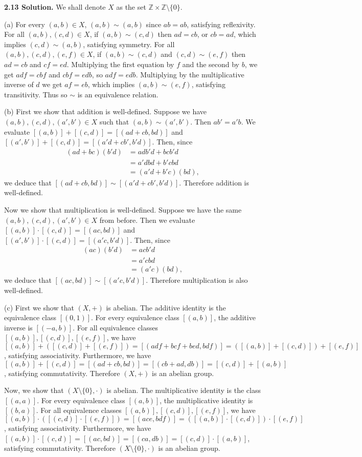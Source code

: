 \textbf{2.13 Solution.} We shall denote $X$ as the set $\mathbb{Z}\times\mathbb{Z}\setminus\{0\}$.

(a) For every $(a,b)\in X$, $(a,b)\sim(a,b)$ since $ab=ab$, satisfying reflexivity. For all $(a,b),(c,d)\in X$, if $(a,b)\sim(c,d)$ then $ad=cb$, or $cb=ad$, which implies $(c,d)\sim(a,b)$, satisfying symmetry. For all $(a,b),(c,d),(e,f)\in X$, if $(a,b)\sim(c,d)$ and $(c,d)\sim(e,f)$ then $ad=cb$ and $cf=ed$. Multiplying the first equation by $f$ and the second by $b$, we get $adf=cbf$ and $cbf=edb$, so $adf=edb$. Multiplying by the multiplicative inverse of $d$ we get $af=eb$, which implies $(a,b)\sim(e,f)$, satisfying transitivity. Thus so $\sim$ is an equivalence relation.

(b) First we show that addition is well-defined. Suppose we have $(a,b),(c,d),(a',b')\in X$ such that $(a,b)\sim(a',b')$. Then $ab'=a'b$. We evaluate $[(a,b)]+[(c,d)]=[(ad+cb,bd)]$ and $[(a',b')]+[(c,d)]=[(a'd+cb',b'd)]$. Then, since
\begin{align*}
    (ad+bc)(b'd) &= adb'd+bcb'd \\
                 &= a'dbd+b'cbd \\
                 &= (a'd+b'c)(bd),
\end{align*}
we deduce that $[(ad+cb,bd)]\sim[(a'd+cb',b'd)]$. Therefore addition is well-defined.

Now we show that multiplication is well-defined. Suppose we have the same $(a,b),(c,d),(a',b') \in X$ from before. Then we evaluate $[(a,b)]\cdot[(c,d)] = [(ac,bd)]$ and $[(a',b')]\cdot[(c,d)] = [(a'c,b'd)]$. Then, since 
\begin{align*}
    (ac)(b'd) &= acb'd \\
              &= a'cbd \\
              &= (a'c)(bd),
\end{align*}
we deduce that $[(ac,bd)]\sim[(a'c,b'd)]$. Therefore multiplication is also well-defined.

(c) First we show that $(X,+)$ is abelian. The additive identity is the equivalence class $[(0,1)]$. For every equivalence class $[(a,b)]$, the additive inverse is $[(-a,b)]$. For all equivalence classes $[(a,b)],[(c,d)],[(e,f)]$, we have $[(a,b)]+([(c,d)]+[(e,f)])=[(adf+bcf+bed,bdf)]=([(a,b)]+[(c,d)])+[(e,f)]$, satisfying associativity. Furthermore, we have $[(a,b)]+[(c,d)]=[(ad+cb,bd)]=[(cb+ad,db)]=[(c,d)]+[(a,b)]$, satisfying commutativity. Therefore $(X,+)$ is an abelian group.

Now, we show that $(X\setminus\{0\},\cdot)$ is abelian. The multiplicative identity is the class $[(a,a)]$. For every equivalence class $[(a,b)]$, the multiplicative identity is $[(b,a)]$. For all equivalence classes $[(a,b)],[(c,d)],[(e,f)]$, we have $[(a,b)]\cdot([(c,d)]\cdot[(e,f)]) = [(ace,bdf)] = ([(a,b)]\cdot[(c,d)])\cdot[(e,f)]$, satisfying associativity. Furthermore, we have $[(a,b)]\cdot[(c,d)] = [(ac,bd)] = [(ca,db)] = [(c,d)]\cdot[(a,b)]$, satisfying commutativity. Therefore $(X\setminus\{0\},\cdot)$ is an abelian group.

